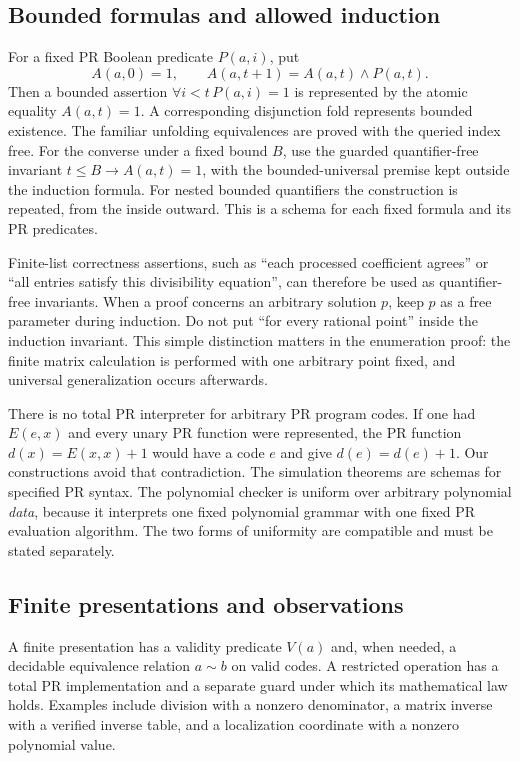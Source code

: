 \subsection{Bounded formulas and allowed induction}

For a fixed PR Boolean predicate $P(a,i)$, put
\[
 A(a,0)=1,\qquad A(a,t+1)=A(a,t)\mathbin{\wedge}P(a,t).
\]
Then a bounded assertion $\forall i<t\,P(a,i)=1$ is represented by
the atomic equality $A(a,t)=1$. A corresponding disjunction fold
represents bounded existence. The familiar unfolding equivalences
are proved with the queried index free. For the converse under a fixed
bound $B$, use the guarded quantifier-free invariant
$t\le B\to A(a,t)=1$, with the bounded-universal premise kept
outside the induction formula. For nested bounded
quantifiers the construction is repeated, from the inside outward.
This is a schema for each fixed formula and its PR predicates.

Finite-list correctness assertions, such as ``each processed coefficient
agrees'' or ``all entries satisfy this divisibility equation'', can
therefore be used as quantifier-free invariants. When a proof concerns
an arbitrary solution $p$, keep $p$ as a free parameter during induction.
Do not put ``for every rational point'' inside the induction invariant.
This simple distinction matters in the enumeration proof: the finite
matrix calculation is performed with one arbitrary point fixed, and
universal generalization occurs afterwards.

There is no total PR interpreter for arbitrary PR program codes. If
one had $E(e,x)$ and every unary PR function were represented, the
PR function $d(x)=E(x,x)+1$ would have a code $e$ and give
$d(e)=d(e)+1$. Our constructions avoid that contradiction. The simulation
theorems are schemas for specified PR syntax. The polynomial checker
is uniform over arbitrary polynomial \emph{data}, because it interprets
one fixed polynomial grammar with one fixed PR evaluation algorithm.
The two forms of uniformity are compatible and must be stated separately.

\subsection{Finite presentations and observations}

A finite presentation has a validity predicate $V(a)$ and, when needed,
a decidable equivalence relation $a\sim b$ on valid codes. A restricted
operation has a total PR implementation and a separate guard under which
its mathematical law holds. Examples include division with a nonzero
denominator, a matrix inverse with a verified inverse table, and a
localization coordinate with a nonzero polynomial value.

